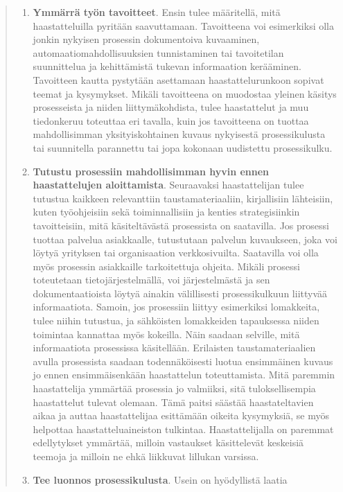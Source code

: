 \documentclass[
  finnish,
  letterpaper,
  DIV=11,
  numbers=noendperiod,
  oneside]{scrreprt}
\begin{document}
\begin{quote}
\begin{enumerate}
\def\labelenumi{\arabic{enumi}.}
\item
  \textbf{Ymmärrä työn tavoitteet}. Ensin tulee määritellä, mitä
  haastatteluilla pyritään saavuttamaan. Tavoitteena voi esimerkiksi
  olla jonkin nykyisen prosessin dokumentoiva kuvaaminen,
  automaatiomahdollisuuksien tunnistaminen tai tavoitetilan suunnittelua
  ja kehittämistä tukevan informaation kerääminen. Tavoitteen kautta
  pystytään asettamaan haastattelurunkoon sopivat teemat ja kysymykset.
  Mikäli tavoitteena on muodostaa yleinen käsitys prosesseista ja niiden
  liittymäkohdista, tulee haastattelut ja muu tiedonkeruu toteuttaa eri
  tavalla, kuin jos tavoitteena on tuottaa mahdollisimman
  yksityiskohtainen kuvaus nykyisestä prosessikulusta tai suunnitella
  parannettu tai jopa kokonaan uudistettu prosessikulku.
\item
  \textbf{Tutustu prosessiin mahdollisimman hyvin ennen haastattelujen
  aloittamista}. Seuraavaksi haastattelijan tulee tutustua kaikkeen
  relevanttiin taustamateriaaliin, kirjallisiin lähteisiin, kuten
  työohjeisiin sekä toiminnallisiin ja kenties strategisiinkin
  tavoitteisiin, mitä käsiteltävästä prosessista on saatavilla. Jos
  prosessi tuottaa palvelua asiakkaalle, tutustutaan palvelun
  kuvaukseen, joka voi löytyä yrityksen tai organisaation
  verkkosivuilta. Saatavilla voi olla myös prosessin asiakkaille
  tarkoitettuja ohjeita. Mikäli prosessi toteutetaan
  tietojärjestelmällä, voi järjestelmästä ja sen dokumentaatioista
  löytyä ainakin välillisesti prosessikulkuun liittyvää informaatiota.
  Samoin, jos prosessiin liittyy esimerkiksi lomakkeita, tulee niihin
  tutustua, ja sähköisten lomakkeiden tapauksessa niiden toimintaa
  kannattaa myös kokeilla. Näin saadaan selville, mitä informaatiota
  prosessissa käsitellään. Erilaisten taustamateriaalien avulla
  prosessista saadaan todennäköisesti luotua ensimmäinen kuvaus jo ennen
  ensimmäisenkään haastattelun toteuttamista. Mitä paremmin
  haastattelija ymmärtää prosessia jo valmiiksi, sitä tuloksellisempia
  haastattelut tulevat olemaan. Tämä paitsi säästää haastateltavien
  aikaa ja auttaa haastattelijaa esittämään oikeita kysymyksiä, se myös
  helpottaa haastatteluaineiston tulkintaa. Haastattelijalla on paremmat
  edellytykset ymmärtää, milloin vastaukset käsittelevät keskeisiä
  teemoja ja milloin ne ehkä liikkuvat lillukan varsissa.
\item
  \textbf{Tee luonnos prosessikulusta}. Usein on hyödyllistä laatia

\end{enumerate}
\end{quote}
\end{document}
